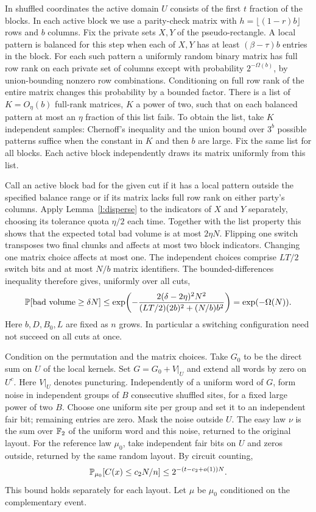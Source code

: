 \documentclass[11pt]{article}
\begin{document}
In shuffled coordinates the active domain $U$ consists of the first $t$ fraction of the blocks. In each active block we use a parity-check matrix with $h=\lfloor(1-r)b\rfloor$ rows and $b$ columns. Fix the private sets $X,Y$ of the pseudo-rectangle. A local pattern is balanced for this step when each of $X,Y$ has at least $(\beta-\tau)b$ entries in the block. For each such pattern a uniformly random binary matrix has full row rank on each private set of columns except with probability $2^{-\Omega(b)}$, by union-bounding nonzero row combinations. Conditioning on full row rank of the entire matrix changes this probability by a bounded factor. There is a list of $K=O_\eta(b)$ full-rank matrices, $K$ a power of two, such that on each balanced pattern at most an $\eta$ fraction of this list fails. To obtain the list, take $K$ independent samples: Chernoff's inequality and the union bound over $3^b$ possible patterns suffice when the constant in $K$ and then $b$ are large. Fix the same list for all blocks. Each active block independently draws its matrix uniformly from this list.

Call an active block bad for the given cut if it has a local pattern outside the specified balance range or if its matrix lacks full row rank on either party's columns. Apply Lemma~\ref{l:disperse} to the indicators of $X$ and $Y$ separately, choosing its tolerance quota $\eta/2$ each time. Together with the list property this shows that the expected total bad volume is at most $2\eta N$. Flipping one switch transposes two final chunks and affects at most two block indicators. Changing one matrix choice affects at most one. The independent choices comprise $LT/2$ switch bits and at most $N/b$ matrix identifiers. The bounded-differences inequality therefore gives, uniformly over all cuts,
\begin{equation}\label{eq:bad}
 \mathbb P[\text{bad volume}\ge\delta N]\le
 \exp\!\left(-\frac{2(\delta-2\eta)^2N^2}{(LT/2)(2b)^2+(N/b)b^2}\right)
 =\exp(-\Omega(N)).
\end{equation}
Here $b,D,B_0,L$ are fixed as $n$ grows. In particular a switching configuration need not succeed on all cuts at once.

Condition on the permutation and the matrix choices. Take $G_0$ to be the direct sum on $U$ of the local kernels. Set $G=G_0+V|_U$ and extend all words by zero on $U^c$. Here $V|_U$ denotes puncturing. Independently of a uniform word of $G$, form noise in independent groups of $B$ consecutive shuffled sites, for a fixed large power of two $B$. Choose one uniform site per group and set it to an independent fair bit; remaining entries are zero. Mask the noise outside $U$. The easy law $\nu$ is the sum over $\mathbb F_2$ of the uniform word and this noise, returned to the original layout. For the reference law $\mu_0$, take independent fair bits on $U$ and zeros outside, returned by the same random layout. By circuit counting,
\[
 \mathbb P_{\mu_0}[C(x)\le c_2N/n]\le2^{-(t-c_2+o(1))N}.
\]
This bound holds separately for each layout. Let $\mu$ be $\mu_0$ conditioned on the complementary event.
\end{document}
